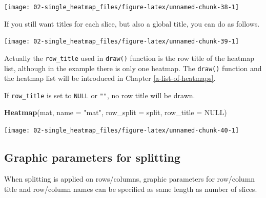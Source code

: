 \documentclass[]{book}
\newenvironment{Shaded}{\begin{snugshade}}{\end{snugshade}}
\newcommand{\KeywordTok}[1]{\textcolor[rgb]{0.13,0.29,0.53}{\textbf{#1}}}
\newcommand{\DataTypeTok}[1]{\textcolor[rgb]{0.13,0.29,0.53}{#1}}
\newcommand{\StringTok}[1]{\textcolor[rgb]{0.31,0.60,0.02}{#1}}
\newcommand{\OtherTok}[1]{\textcolor[rgb]{0.56,0.35,0.01}{#1}}
\newcommand{\NormalTok}[1]{#1}
\theoremstyle{definition}
\theoremstyle{definition}
\theoremstyle{definition}
\theoremstyle{remark}
\begin{document}
\begin{center}\texttt{[image: 02-single\_heatmap\_files/figure-latex/unnamed-chunk-38-1]} \end{center}

If you still want titles for each slice, but also a global title, you
can do as follows.

\begin{Shaded}
\end{Shaded}

\begin{center}\texttt{[image: 02-single\_heatmap\_files/figure-latex/unnamed-chunk-39-1]} \end{center}

Actually the \texttt{row\_title} used in \texttt{draw()} function is the
row title of the heatmap list, although in the example there is only one
heatmap. The \texttt{draw()} function and the heatmap list will be
introduced in Chapter \ref{a-list-of-heatmaps}.

If \texttt{row\_title} is set to \texttt{NULL} or \texttt{""}, no row
title will be drawn.

\begin{Shaded}
\begin{Highlighting}[]
\KeywordTok{Heatmap}\NormalTok{(mat, }\DataTypeTok{name =} \StringTok{"mat"}\NormalTok{, }\DataTypeTok{row_split =}\NormalTok{ split, }\DataTypeTok{row_title =} \OtherTok{NULL}\NormalTok{)}
\end{Highlighting}
\end{Shaded}

\begin{center}\texttt{[image: 02-single\_heatmap\_files/figure-latex/unnamed-chunk-40-1]} \end{center}

\subsection{Graphic parameters for
splitting}\label{graphic-parameters-for-splitting}

When splitting is applied on rows/columns, graphic parameters for
row/column title and row/column names can be specified as same length as
number of slices.
\end{document}
